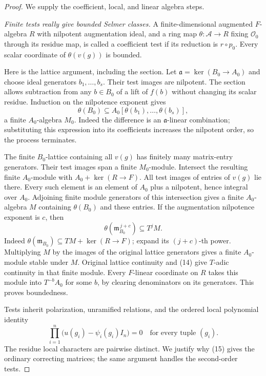 \begin{proof}
We supply the coefficient, local, and linear algebra steps.

\emph{Finite tests really give bounded Selmer classes.}
A finite-dimensional augmented $F$-algebra $R$ with nilpotent
augmentation ideal, and a ring map $\theta:\mathcal A\to R$
fixing $\mathcal O_0$ through its residue map, is called a
coefficient test if its reduction is $r\circ p_0$.
Every scalar coordinate of $\theta(v(g))$ is bounded.

Here is the lattice argument, including the section.
Let $\mathfrak a=\ker(B_0\to A_0)$ and choose ideal generators
$b_1,\ldots,b_s$.  Their test images are nilpotent.
The section allows subtraction from any $b\in B_0$ of a lift
of $f(b)$ without changing its scalar residue.
Induction on the nilpotence exponent gives
\[
 \theta(B_0)\subseteq
 A_0[\theta(b_1),\ldots,\theta(b_s)],
\]
a finite $A_0$-algebra $M_0$.
Indeed the difference is an $\mathfrak a$-linear combination;
substituting this expression into its coefficients increases
the nilpotent order, so the process terminates.

The finite $B_0$-lattice containing all $v(g)$ has finitely many
matrix-entry generators.  Their test images span a finite
$M_0$-module.  Intersect the resulting finite $A_0$-module with
$A_0+\ker(R\to F)$.  All test images of entries of $v(g)$ lie
there.  Every such element is an element of $A_0$ plus a
nilpotent, hence integral over $A_0$.
Adjoining finite module generators of this intersection gives
a finite $A_0$-algebra $M$ containing $\theta(B_0)$ and these
entries.  If the augmentation nilpotence exponent is $c$, then
\[
       \theta(\mathfrak m_{B_0}^{\,j+c})\subseteq T^jM.          \tag{14}
\]
Indeed $\theta(\mathfrak m_{B_0})\subseteq TM+\ker(R\to F)$;
expand its $(j+c)$-th power.
Multiplying $M$ by the images of the original lattice generators
gives a finite $A_0$-module stable under $M$.
Original lattice continuity and (14) give $T$-adic continuity
in that finite module.  Every $F$-linear coordinate on $R$
takes this module into $T^{-b}A_0$ for some $b$, by clearing
denominators on its generators.  This proves boundedness.

Tests inherit polarization, unramified relations, and the
ordered local polynomial identity
\[
 \prod_{i=1}^n\bigl(u(g_i)-\psi_i(g_i)I_n\bigr)=0
                       \quad\text{for every tuple }(g_i).      \tag{15}
\]
The residue local characters are pairwise distinct.
We justify why (15) gives the ordinary correcting matrices;
the same argument handles the second-order tests.


\end{proof}
